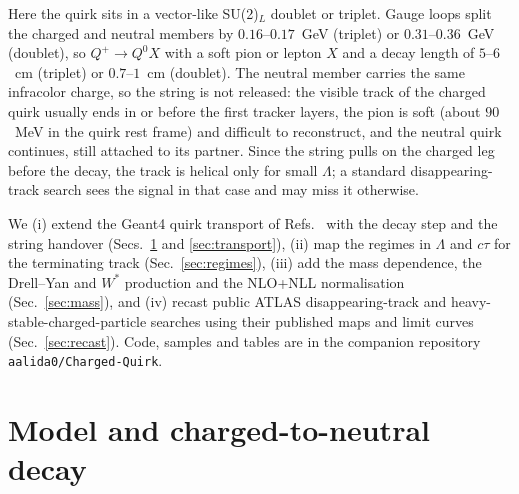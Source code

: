 \documentclass[prd,twocolumn,nofootinbib,superscriptaddress,amsmath,amssymb]{revtex4-2}
\begin{document}
Here the quirk sits in a vector-like SU(2)$_L$ doublet or triplet. Gauge loops split the charged and neutral members by $0.16$--$0.17$~GeV (triplet) or $0.31$--$0.36$~GeV (doublet), so $Q^+\to Q^0 X$ with a soft pion or lepton $X$ and a decay length of $5$--$6$~cm (triplet) or $0.7$--$1$~cm (doublet). The neutral member carries the same infracolor charge, so the string is not released: the visible track of the charged quirk usually ends in or before the first tracker layers, the pion is soft (about $90$~MeV in the quirk rest frame) and difficult to reconstruct, and the neutral quirk continues, still attached to its partner. Since the string pulls on the charged leg before the decay, the track is helical only for small $\Lambda$; a standard disappearing-track search sees the signal in that case and may miss it otherwise.

We (i) extend the Geant4 quirk transport of Refs.~\cite{QuirkPheno,Vami:2026} with the decay step and the string handover (Secs.~\ref{sec:model} and \ref{sec:transport}), (ii) map the regimes in $\Lambda$ and $c\tau$ for the terminating track (Sec.~\ref{sec:regimes}), (iii) add the mass dependence, the Drell--Yan and $W^*$ production and the NLO+NLL normalisation (Sec.~\ref{sec:mass}), and (iv) recast public ATLAS disappearing-track and heavy-stable-charged-particle searches using their published maps and limit curves (Sec.~\ref{sec:recast}). Code, samples and tables are in the companion repository \texttt{aalida0/Charged-Quirk}.

\section{Model and charged-to-neutral decay}\label{sec:model}
\end{document}
